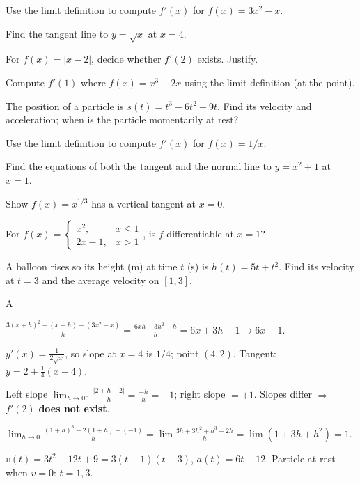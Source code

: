 \documentclass[11pt]{article}
\begin{document}
\begin{problems}
\item Use the limit definition to compute $f'(x)$ for $f(x) = 3x^2 - x$.
\item Find the tangent line to $y = \sqrt{x}$ at $x = 4$.
\item For $f(x) = |x - 2|$, decide whether $f'(2)$ exists. Justify.
\item Compute $f'(1)$ where $f(x) = x^3 - 2x$ using the limit definition (at the point).
\item The position of a particle is $s(t) = t^3 - 6t^2 + 9t$. Find its velocity and acceleration; when is the particle momentarily at rest?
\end{problems}

\vfill
\newpage
{}
\begin{problems}
\item Use the limit definition to compute $f'(x)$ for $f(x) = 1/x$.
\item Find the equations of both the tangent and the normal line to $y = x^2 + 1$ at $x = 1$.
\item Show $f(x) = x^{1/3}$ has a vertical tangent at $x = 0$.
\item For $f(x) = \begin{cases} x^2, & x \le 1 \\ 2x - 1, & x > 1\end{cases}$, is $f$ differentiable at $x = 1$?
\item A balloon rises so its height (m) at time $t$ (s) is $h(t) = 5t + t^2$. Find its velocity at $t = 3$ and the average velocity on $[1, 3]$.
\end{problems}

\vfill
\newpage
{}

\begin{answers}{A}
\item $\tfrac{3(x+h)^2 - (x+h) - (3x^2 - x)}{h} = \tfrac{6xh + 3h^2 - h}{h} = 6x + 3h - 1 \to \boxed{6x - 1}$.
\item $y'(x) = \tfrac{1}{2\sqrt x}$, so slope at $x=4$ is $1/4$; point $(4,2)$. Tangent: $\boxed{y = 2 + \tfrac{1}{4}(x - 4)}$.
\item Left slope $\lim_{h\to 0^-} \tfrac{|2+h-2|}{h} = \tfrac{-h}{h} = -1$; right slope $=+1$. Slopes differ $\Rightarrow$ $f'(2)$ \textbf{does not exist}.
\item $\lim_{h\to 0} \tfrac{(1+h)^3 - 2(1+h) - (-1)}{h} = \lim \tfrac{3h + 3h^2 + h^3 - 2h}{h} = \lim(1 + 3h + h^2) = \boxed{1}$.
\item $v(t) = 3t^2 - 12t + 9 = 3(t-1)(t-3)$, $a(t) = 6t - 12$. Particle at rest when $v=0$: $\boxed{t = 1, 3}$.
\end{answers}
\end{document}
